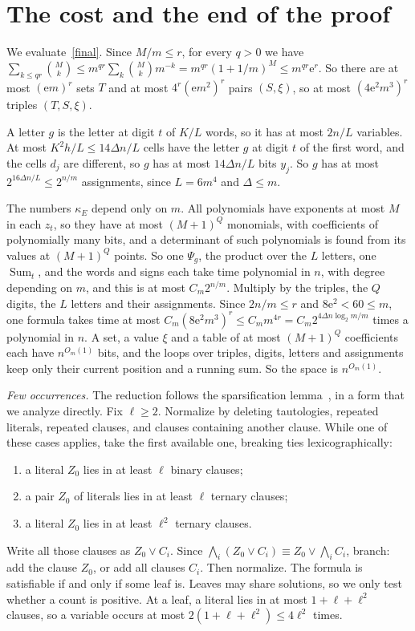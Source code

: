 \documentclass[11pt]{article}
\numberwithin{equation}{section}
\theoremstyle{remark}
\begin{document}
\section{The cost and the end of the proof}\label{sec:cost}

We evaluate~\eqref{final}. Since $M/m\le r$, for every $q>0$ we have $\sum_{k\le qr}\binom Mk\le m^{qr}\sum_k\binom Mkm^{-k}=m^{qr}(1+1/m)^M\le m^{qr}\mathrm e^r$. So there are at most $(\mathrm em)^r$ sets $T$ and at most $4^r(\mathrm em^2)^r$ pairs $(S,\xi)$, so at most $(4\mathrm e^2m^3)^r$ triples $(T,S,\xi)$.

A letter $g$ is the letter at digit $t$ of $K/L$ words, so it has at most $2n/L$ variables. At most $K^2h/L\le14\Delta n/L$ cells have the letter $g$ at digit $t$ of the first word, and the cells $d_j$ are different, so $g$ has at most $14\Delta n/L$ bits $y_j$. So $g$ has at most $2^{16\Delta n/L}\le2^{n/m}$ assignments, since $L=6m^4$ and $\Delta\le m$.

The numbers $\kappa_E$ depend only on $m$. All polynomials have exponents at most $M$ in each $z_t$, so they have at most $(M+1)^Q$ monomials, with coefficients of polynomially many bits, and a determinant of such polynomials is found from its values at $(M+1)^Q$ points. So one $\Psi_g$, the product over the $L$ letters, one $\operatorname{Sum}_t$, and the words and signs each take time polynomial in $n$, with degree depending on $m$, and this is at most $C_m2^{n/m}$. Multiply by the triples, the $Q$ digits, the $L$ letters and their assignments. Since $2n/m\le r$ and $8\mathrm e^2<60\le m$, one formula takes time at most $C_m(8\mathrm e^2m^3)^r\le C_mm^{4r}=C_m2^{4\Delta n\log_2m/m}$ times a polynomial in $n$. A set, a value $\xi$ and a table of at most $(M+1)^Q$ coefficients each have $n^{O_m(1)}$ bits, and the loops over triples, digits, letters and assignments keep only their current position and a running sum. So the space is $n^{O_m(1)}$.

\medskip\noindent\emph{Few occurrences.} The reduction follows the sparsification lemma~\cite{IPZ01}, in a form that we analyze directly. Fix $\ell\ge2$. Normalize by deleting tautologies, repeated literals, repeated clauses, and clauses containing another clause. While one of these cases applies, take the first available one, breaking ties lexicographically:
\begin{enumerate}
\item[(i)] a literal $Z_0$ lies in at least $\ell$ binary clauses;
\item[(ii)] a pair $Z_0$ of literals lies in at least $\ell$ ternary clauses;
\item[(iii)] a literal $Z_0$ lies in at least $\ell^2$ ternary clauses.
\end{enumerate}
Write all those clauses as $Z_0\vee C_i$. Since $\bigwedge_i(Z_0\vee C_i)\equiv Z_0\vee\bigwedge_iC_i$, branch: add the clause $Z_0$, or add all clauses $C_i$. Then normalize. The formula is satisfiable if and only if some leaf is. Leaves may share solutions, so we only test whether a count is positive. At a leaf, a literal lies in at most $1+\ell+\ell^2$ clauses, so a variable occurs at most $2(1+\ell+\ell^2)\le4\ell^2$ times.
\end{document}
